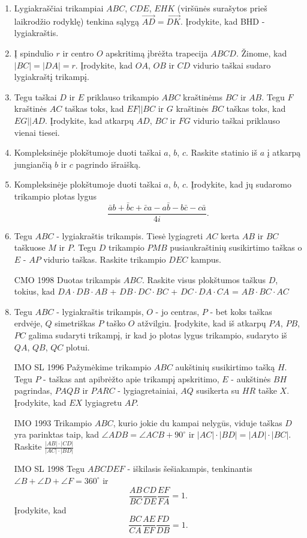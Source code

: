 \begin{enumerate}
\item Lygiakraščiai trikampiai $ABC$, $CDE$, $EHK$ (viršūnės surašytos prieš laikrodžio rodyklę) tenkina sąlygą $\vec{AD} = \vec{DK}$. Įrodykite, kad BHD - lygiakraštis.

\item Į spindulio $r$ ir centro $O$ apskritimą įbrėžta trapecija $ABCD$. Žinome, kad $|BC|=|DA|=r$. Įrodykite, kad $OA$, $OB$ ir $CD$ vidurio taškai sudaro lygiakraštį trikampį. 

\item Tegu taškai $D$ ir $E$ priklauso trikampio $ABC$ kraštinėms $BC$ ir $AB$. Tegu $F$ kraštinės $AC$ taškas toks, kad $EF||BC$ ir $G$ kraštinės $BC$ taškas toks, kad $EG||AD$. Įrodykite, kad atkarpų $AD$, $BC$ ir $FG$ vidurio taškai priklauso vienai tiesei.  

\item Kompleksinėje plokštumoje duoti taškai $a$, $b$, $c$. Raskite statinio iš $a$ į atkarpą jungiančią $b$ ir $c$ pagrindo išraišką. 

\item Kompleksinėje plokštumoje duoti taškai $a$, $b$, $c$. Įrodykite, kad jų sudaromo trikampio plotas lygus $$\frac{\bar{a}b + \bar{b}c + \bar{c}a - a\bar{b} - b\bar{c} - c\bar{a}}{4i}.$$ 

\item Tegu $ABC$ - lygiakraštis trikampis. Tiesė lygiagreti $AC$ kerta $AB$ ir $BC$ taškuose $M$ ir $P$. Tegu $D$ trikampio $PMB$ pusiaukraštinių susikirtimo taškas o $E$ - $AP$ vidurio taškas. Raskite trikampio $DEC$ kampus.

\item [CMO 1998] Duotas trikampis $ABC$. Raskite visus plokštumos taškus $D$, tokius, kad $DA\cdot DB\cdot AB$ + $DB\cdot DC\cdot BC$ + $DC\cdot DA\cdot CA$ = $AB\cdot BC\cdot AC$

\item Tegu $ABC$ - lygiakraštis trikampis, $O$ - jo centras, $P$ - bet koks taškas erdvėje, $Q$ simetriškas $P$ taško $O$ atžvilgiu. Įrodykite, kad iš atkarpų $PA$, $PB$, $PC$ galima sudaryti trikampį, ir kad jo plotas lygus trikampio, sudaryto iš $QA$, $QB$, $QC$ plotui.

\item [IMO SL 1996] Pažymėkime trikampio $ABC$ aukštinių susikirtimo tašką $H$. Tegu $P$ - taškas ant apibrėžto apie trikampį apskritimo, $E$ - aukštinės $BH$ pagrindas, $PAQB$ ir $PARC$ - lygiagretainiai, $AQ$ susikerta su $HR$ taške $X$. Įrodykite, kad $EX$ lygiagretu $AP$.

\item [IMO 1993] Trikampio $ABC$, kurio jokie du kampai nelygūs, viduje taškas $D$ yra parinktas taip, kad $\angle ADB = \angle ACB + 90^{\circ}$ ir $|AC|\cdot|BD| = |AD|\cdot|BC|$. Raskite $\frac{|AB|\cdot|CD|}{|AC|\cdot|BD|}$

\item [IMO SL 1998] Tegu $ABCDEF$ - iškilasis šešiakampis, tenkinantis $\angle B + \angle D + \angle F = 360^{\circ}$ ir $$\frac{AB}{BC}\frac{CD}{DE}\frac{EF}{FA} = 1.$$ Įrodykite, kad $$\frac{BC}{CA}\frac{AE}{EF}\frac{FD}{DB} = 1.$$

\end{enumerate}


